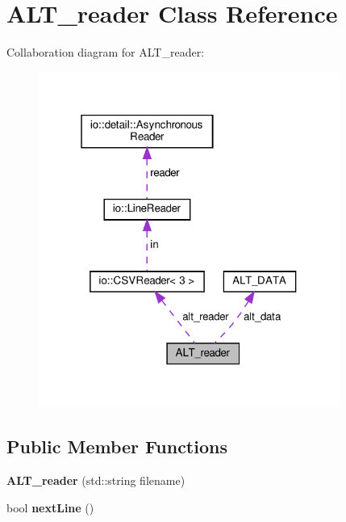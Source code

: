 \hypertarget{classALT__reader}{}\section{A\+L\+T\+\_\+reader Class Reference}
\label{classALT__reader}


Collaboration diagram for A\+L\+T\+\_\+reader\+:\nopagebreak
\begin{figure}[H]
\begin{center}
\leavevmode
\includegraphics[width=280pt]{classALT__reader__coll__graph}
\end{center}
\end{figure}
\subsection*{Public Member Functions}
\begin{DoxyCompactItemize}
\item 
\mbox{\label{classALT__reader_afc32075d3230d4699daa30ffa28fcad3}} 
{\bfseries A\+L\+T\+\_\+reader} (std\+::string filename)
\item 
\mbox{\label{classALT__reader_a7dfb254b4277f7b559a7a68eef087e58}} 
bool {\bfseries next\+Line} ()
\end{DoxyCompactItemize}
